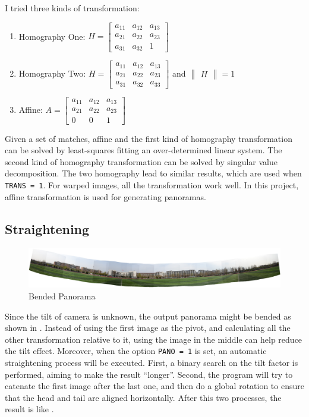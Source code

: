 I tried three kinds of transformation:
\begin{enumerate}
  \item Homography One: $H = \begin{bmatrix} a_{11} &a_{12} & a_{13}\\ a_{21} & a_{22} & a_{23}\\ a_{31} & a_{32} & 1\end{bmatrix}$

  \item Homography Two:
    $H = \begin{bmatrix} a_{11} &a_{12} & a_{13}\\ a_{21} & a_{22} & a_{23}\\ a_{31} & a_{32} & a_{33}\end{bmatrix} $
    and $\begin{Vmatrix} H \end{Vmatrix} = 1$

  \item Affine:
    $A = \begin{bmatrix} a_{11} &a_{12} & a_{13}\\ a_{21} & a_{22} & a_{23}\\ 0 & 0 & 1\end{bmatrix}$
\end{enumerate}

Given a set of matches, affine and the first kind of homography transformation can be solved
by least-squares fitting an over-determined linear system.
The second kind of homography transformation can be solved by singular value decomposition.
The two homography lead to similar results, which are used when \verb|TRANS = 1|.
For warped images, all the transformation work well.
In this project, affine transformation is used for generating panoramas.

\subsection{Straightening}
\begin{figure}[H]
  \centering
  \includegraphics[width=\textwidth]{res/bend.png}
  \caption{Bended Panorama\label{fig:bend}}
\end{figure}

Since the tilt of camera is unknown, the output panorama might be bended as shown in .
Instead of using the first image as the pivot, and calculating all the other transformation relative to it,
using the image in the middle can help reduce the tilt effect.
Moreover, when the option \verb|PANO = 1| is set, an automatic straightening process will be executed.
First, a binary search on the tilt factor is performed, aiming to make the result ``longer''.
Second, the program will try to catenate the first image after the last one,
and then do a global rotation to ensure that the head and tail are aligned horizontally.
After this two processes, the result is like .

